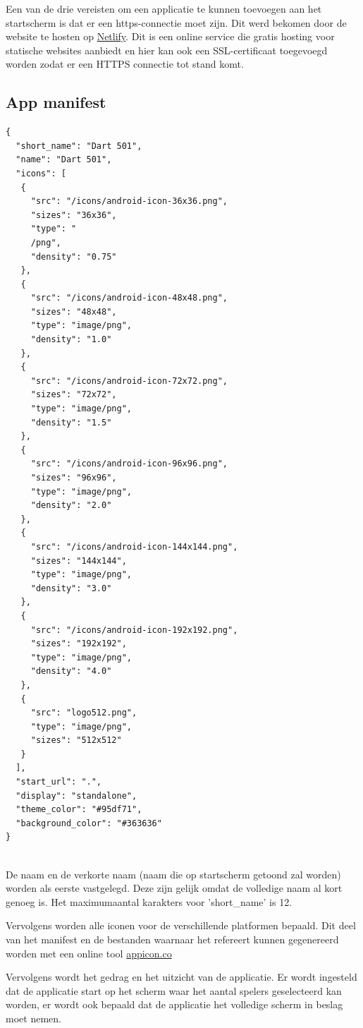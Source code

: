 		Een van de drie vereisten om een applicatie te kunnen toevoegen aan het startscherm is dat er een https-connectie moet zijn. Dit werd bekomen door de website te hosten op \href{https://www.netlify.com/}{ Netlify}. Dit is een online service die gratis hosting voor statische websites aanbiedt en hier kan ook een SSL-certificaat toegevoegd worden zodat er een HTTPS connectie tot stand komt.


	\subsection{App manifest}
\begin{lstlisting}
{
  "short_name": "Dart 501",
  "name": "Dart 501",
  "icons": [
   {
     "src": "/icons/android-icon-36x36.png",
     "sizes": "36x36",
     "type": "
     /png",
     "density": "0.75"
   },
   {
     "src": "/icons/android-icon-48x48.png",
     "sizes": "48x48",
     "type": "image/png",
     "density": "1.0"
   },
   {
     "src": "/icons/android-icon-72x72.png",
     "sizes": "72x72",
     "type": "image/png",
     "density": "1.5"
   },
   {
     "src": "/icons/android-icon-96x96.png",
     "sizes": "96x96",
     "type": "image/png",
     "density": "2.0"
   },
   {
     "src": "/icons/android-icon-144x144.png",
     "sizes": "144x144",
     "type": "image/png",
     "density": "3.0"
   },
   {
     "src": "/icons/android-icon-192x192.png",
     "sizes": "192x192",
     "type": "image/png",
     "density": "4.0"
   },
   {
     "src": "logo512.png",
     "type": "image/png",
     "sizes": "512x512"
   }
  ],
  "start_url": ".",
  "display": "standalone",
  "theme_color": "#95df71",
  "background_color": "#363636"
}
	
\end{lstlisting}
		
		De naam en de verkorte naam (naam die op startscherm getoond zal worden) worden als eerste vastgelegd. Deze zijn gelijk omdat de volledige naam al kort genoeg is. Het maximumaantal karakters voor 'short\_name' is 12.
 
		
		Vervolgens worden alle iconen voor de verschillende platformen bepaald. Dit deel van het manifest en de bestanden waarnaar het refereert kunnen gegenereerd worden met een online tool \href{https://appicon.co}{appicon.co}
		
		Vervolgens wordt het gedrag en het uitzicht van de applicatie. Er wordt ingesteld dat de applicatie start op het scherm waar het aantal spelers geselecteerd kan worden, er wordt ook bepaald dat de applicatie het volledige scherm in beslag moet nemen.
		
